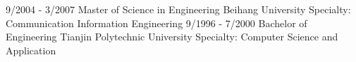 \documentclass[9pt]{developercv} %
\begin{document}
\vspace{-10 pt}
\begin{entrylist}
    \entry
		{9/2004 - 3/2007}
		{Master of Science in Engineering}
		{Beihang University}
		{Specialty: Communication Information Engineering}
    \entry
		{9/1996 - 7/2000}
		{Bachelor of Engineering}
		{Tianjin Polytechnic University}
		{Specialty: Computer Science and Application}
\end{entrylist}

\vspace{-10 pt}
\end{document}
